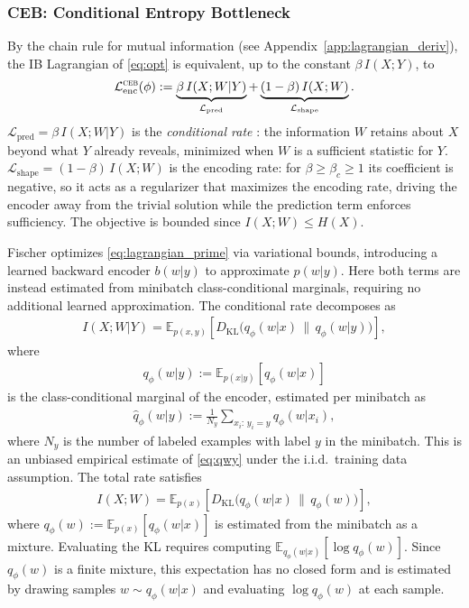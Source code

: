 \documentclass[11pt]{article}
\begin{document}
\subsubsection{CEB: Conditional Entropy Bottleneck}
\label{sec:ceb}

By the chain rule for mutual information
(see Appendix~\ref{app:lagrangian_deriv}), the IB Lagrangian of
\eqref{eq:opt} is equivalent, up to the constant $\beta\,I(X;Y)$, to
\begin{align}
    \mathcal{L}_{\mathrm{enc}}^{\text{\textsc{ceb}}}(\phi)
    := \underbrace{\beta\,I(X;W|Y)}_{\mathcal{L}_{\mathrm{pred}}}
    + \underbrace{(1-\beta)\,I(X;W)}_{\mathcal{L}_{\mathrm{shape}}}.
    \label{eq:lagrangian_prime}
\end{align}
$\mathcal{L}_{\mathrm{pred}} = \beta\,I(X;W|Y)$ is the
\textit{conditional rate} \cite{wyner1976rate,fischer2020conditional}: the
information $W$ retains about $X$ beyond what $Y$ already reveals,
minimized when $W$ is a sufficient statistic for $Y$.
$\mathcal{L}_{\mathrm{shape}} = (1-\beta)\,I(X;W)$ is the encoding rate:
for $\beta\geq\beta_c\geq 1$ its coefficient is negative, so it acts as a
regularizer that maximizes the encoding rate, driving the encoder away
from the trivial solution while the prediction term enforces
sufficiency.
The objective is bounded since $I(X;W)\leq H(X)$.

Fischer \cite{fischer2020conditional} optimizes \eqref{eq:lagrangian_prime}
via variational bounds, introducing a learned backward encoder
$b(w|y)$ to approximate $p(w|y)$.
Here both terms are instead estimated from minibatch class-conditional
marginals, requiring no additional learned approximation.
The conditional rate decomposes as
\begin{align}
    I(X;W|Y) = \mathbb{E}_{p(x,y)}\left[D_{\mathrm{KL}}
    \bigl(q_\phi(w|x)\,\|\,q_\phi(w|y)\bigr)\right],
    \label{eq:ixw_given_y}
\end{align}
where
\begin{align}
    q_\phi(w|y) := \mathbb{E}_{p(x|y)}[q_\phi(w|x)]
    \label{eq:qwy}
\end{align}
is the class-conditional marginal of the encoder, estimated per
minibatch as
\begin{align}
    \hat{q}_\phi(w|y) := \frac{1}{N_y}\sum_{x_i:\,y_i=y} q_\phi(w|x_i),
    \label{eq:qwy_hat}
\end{align}
where $N_y$ is the number of labeled examples with label $y$ in the
minibatch. This is an unbiased empirical estimate of \eqref{eq:qwy}
under the i.i.d.\ training data assumption.
The total rate satisfies
\begin{align}
    I(X;W) = \mathbb{E}_{p(x)}\left[D_{\mathrm{KL}}
    \bigl(q_\phi(w|x)\,\|\,q_\phi(w)\bigr)\right],
    \label{eq:compression}
\end{align}
where $q_\phi(w):=\mathbb{E}_{p(x)}[q_\phi(w|x)]$ is estimated from
the minibatch as a mixture.
Evaluating the KL requires computing
$\mathbb{E}_{q_\phi(w|x)}[\log q_\phi(w)]$. Since $q_\phi(w)$ is a
finite mixture, this expectation has no closed form
\cite{bishop2006pattern} and is estimated by drawing samples $w\sim q_\phi(w|x)$ and
evaluating $\log q_\phi(w)$ at each sample.
\end{document}
